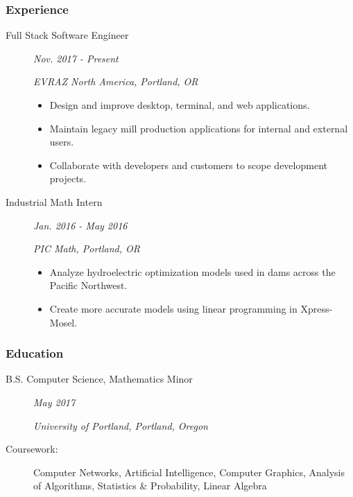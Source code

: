 \documentclass{article}
\begin{document}

\subsubsection*{Experience}

    \begin{description}
		
		\item[Full Stack Software Engineer] \hfill \textit{Nov. 2017 - Present}
		
		\textit{EVRAZ North America, Portland, OR}
		\begin{itemize}
			\item Design and improve desktop, terminal, and web applications.
			\item Maintain legacy mill production applications for internal and external users.
			\item Collaborate with developers and customers to scope development projects.
		\end{itemize}
		
		\vspace{0.5em}
		
        \item[Industrial Math Intern] \hfill \textit{Jan. 2016 - May 2016}
        
        \textit{PIC Math, Portland, OR}
        \begin{itemize}
            \item Analyze hydroelectric optimization models used in dams across the Pacific Northwest.
            \item Create more accurate models using linear programming in Xpress-Mosel.
        \end{itemize}

        
    \end{description}
    
\subsubsection*{Education}
    \begin{description}
        \item[B.S. Computer Science, Mathematics Minor]\hfill \textit{May 2017}

        \textit{University of Portland, Portland, Oregon}

        \vspace{0.5em}

        \item[Coursework:]
            Computer Networks, 
            Artificial Intelligence, 
            Computer Graphics, 
            Analysis of Algorithms,
            Statistics \& Probability,
            Linear Algebra
    \end{description}
\end{document}
